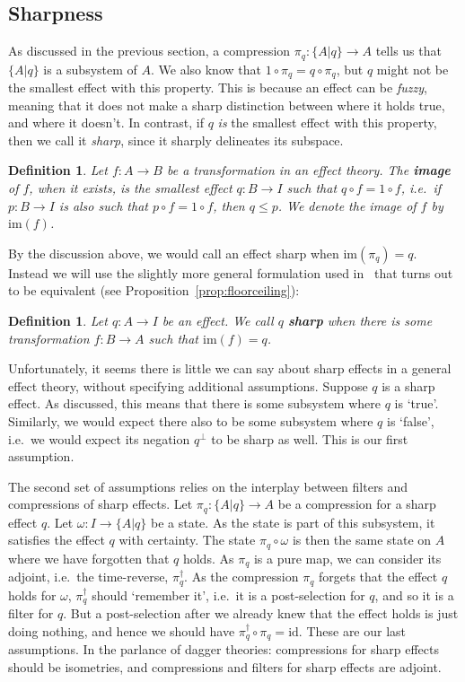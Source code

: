 \documentclass[b5paper,onecolumn,12pt,accepted=2019-05-03, issue=1, volume=1, shorttitle=papers/compositionality-1-1]{compositionalityarticle}
\newcounter{counter}
\numberwithin{counter}{section}
\newtheorem{definition}[counter]{Definition}
\newcommand{\id}{\text{id}}
\newcommand{\im}[1]{\text{im}(#1)}
\begin{document}
\subsection{Sharpness}

As discussed in the previous section, a compression ${\pi_q: \{A\lvert q\}\rightarrow A}$ tells us that $\{A\lvert q\}$ is a subsystem of $A$. We also know that $1\circ\pi_q = q\circ\pi_q$, but $q$ might not be the smallest effect with this property. This is because an effect can be \emph{fuzzy}, meaning that it does not make a sharp distinction between where it holds true, and where it doesn't. In contrast, if $q$ \emph{is} the smallest effect with this property, then we call it \emph{sharp}, since it sharply delineates its subspace.

\begin{definition}
    Let $f:A\rightarrow B$ be a transformation in an effect theory. The \textbf{image} of $f$, when it exists, is the smallest effect $q:B\rightarrow I$ such that $q\circ f = 1\circ f$, i.e.\ if $p:B\rightarrow I$ is also such that $p\circ f = 1\circ f$, then $q\leq p$. We denote the image of $f$ by $\im{f}$.
\end{definition}

By the discussion above, we would call an effect sharp when $\im{\pi_q}=q$. Instead we will use the slightly more general formulation used in~\cite{basthesis} that turns out to be equivalent (see Proposition~\ref{prop:floorceiling}):

\begin{definition}
    Let $q:A\rightarrow I$ be an effect. We call $q$ \textbf{sharp} when there is some transformation $f:B\rightarrow A$ such that $\im{f} = q$.
\end{definition}

Unfortunately, it seems there is little we can say about sharp effects in a general effect theory, without specifying additional assumptions. Suppose $q$ is a sharp effect. As discussed, this means that there is some subsystem where $q$ is `true'. Similarly, we would expect there also to be some subsystem where $q$ is `false', i.e.\ we would expect its negation $q^\perp$ to be sharp as well. This is our first assumption.

The second set of assumptions relies on the interplay between filters and compressions of sharp effects. Let $\pi_q:\{A\lvert q\}\rightarrow A$ be a compression for a sharp effect $q$. Let $\omega:I\rightarrow \{A\lvert q\}$ be a state. 
As the state is part of this subsystem, it satisfies the effect $q$ with certainty. 
The state $\pi_q\circ\omega$ is then the same state on $A$ where we have forgotten that $q$ holds. As $\pi_q$ is a pure map, we can consider its adjoint, i.e.\ the time-reverse, $\pi_q^\dagger$. As the compression $\pi_q$ forgets that the effect $q$ holds for $\omega$, $\pi_q^\dagger$ should `remember it', i.e.\ it is a post-selection for $q$, and so it is a filter for $q$. But a post-selection after we already knew that the effect holds is just doing nothing, and hence we should have $\pi_q^\dagger \circ \pi_q = \id$. These are our last assumptions. In the parlance of dagger theories: compressions for sharp effects should be isometries, and compressions and filters for sharp effects are adjoint.
\end{document}
